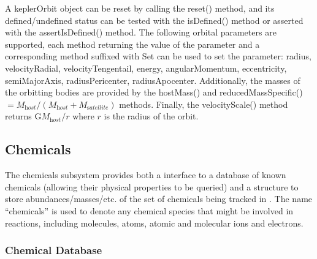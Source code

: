 A {\normalfont \ttfamily keplerOrbit} object can be reset by calling the {\normalfont \ttfamily reset()} method, and its defined/undefined status can be tested with the {\normalfont \ttfamily isDefined()} method or asserted with the {\normalfont \ttfamily assertIsDefined()} method. The following orbital parameters are supported, each method returning the value of the parameter and a corresponding method suffixed with {\normalfont \ttfamily Set} can be used to set the parameter: {\normalfont \ttfamily radius}, {\normalfont \ttfamily velocityRadial}, {\normalfont \ttfamily velocityTengentail}, {\normalfont \ttfamily energy}, {\normalfont \ttfamily angularMomentum}, {\normalfont \ttfamily eccentricity}, {\normalfont \ttfamily semiMajorAxis}, {\normalfont \ttfamily radiusPericenter}, {\normalfont \ttfamily radiusApocenter}. Additionally, the masses of the orbitting bodies are provided by the {\normalfont \ttfamily hostMass()} and {\normalfont \ttfamily reducedMassSpecific()}$=M_{\mathrm host}/(M_{\mathrm host}+M_{\mathrm satellite})$ methods. Finally, the {\normalfont \ttfamily velocityScale()} method returns ${\mathrm G}M_{\mathrm host}/r$ where $r$ is the radius of the orbit.

\subsection{Chemicals}\label{sec:ChemicalSubsystem}

The chemicals subsystem provides both a interface to a database of known chemicals (allowing their physical properties to be queried) and a structure to store abundances/masses/etc. of the set of chemicals being tracked in \glc. The name ``chemicals'' is used to denote any chemical species that might be involved in reactions, including molecules, atoms, atomic and molecular ions and electrons.

\subsubsection{Chemical Database}

